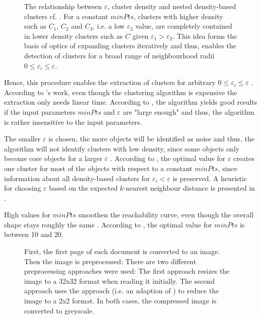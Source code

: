 \begin{figure}[htp] %
    \centering
    
    \caption{The relationship between $\varepsilon$, cluster density and nested density-based clusters cf. \cite{OPTICS1999}.
    For a constant $minPts$, clusters with higher density such as $C_1$, $C_2$ and $C_3$, i.e. a low $\varepsilon_2$ value, 
    are completely contained in lower density clusters such as $C$ given $\varepsilon_1 > \varepsilon_2$.
    This idea forms the basis of \ac{optics} of expanding clusters iteratively and thus, 
    enables the detection of clusters for a broad range of neighbourhood radii $0 \le \varepsilon_i \le \varepsilon$.
    }
    \label{fig:nested_density_cluster}
\end{figure}

Hence, this procedure enables the extraction of clusters for arbitrary $0 \le \varepsilon_i \le \varepsilon$ \cite{OPTICS_kMeans_2016, OPTICS1999}.
According to \citeauthor{OPTICS2013}'s work, even though the clustering algorithm is expensive the extraction only needs linear time.
According to \cite{OPTICS1999}, the algorithm yields good results if the input parameters $minPts$ and $\varepsilon$ are "large enough" and thus, the algorithm is rather insensitive to the input parameters.

The smaller $\varepsilon$ is chosen, the more objects will be identified as noise and thus, the algorithm will not identify clusters with low density, 
since some objects only become core objects for a larger $\varepsilon$ \cite{OPTICS1999}.
According to \citeauthor{OPTICS1999}, the optimal value for $\varepsilon$ creates one cluster for most of the objects with respect to a constant $minPts$,
since information about all density-based clusters for $\varepsilon_i < \varepsilon$ is preserved.
A heuristic for choosing $\varepsilon$ based on the expected $k$-nearest neighbour distance is presented in \cite{OPTICS1999}.

High values for $minPts$ smoothen the reachability curve, even though the overall shape stays roughly the same \cite{OPTICS1999}.
According to \citeauthor{OPTICS1999}, the optimal value for $minPts$ is between 10 and 20.

\begin{figure}[htp] %
    \centering
    
    \caption{First, the first page of each document is converted to an image.
    Then the image is preprocessed:
    There are two different preprocessing approaches were used:
    The first approach resizes the image to a 32x32 format when reading it initially.
    The second approach uses the \eigendocs{} approach (i.e. an adaption of \eigenfaces{}) to reduce the image to a 2x2 format.
    In both cases, the compressed image is converted to greyscale.
    }
    \label{fig:OPTICS_procedure}
\end{figure}

